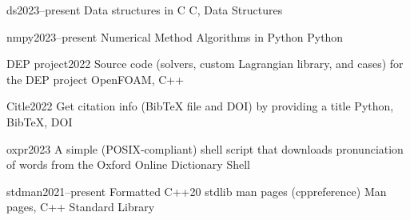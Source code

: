 
\begin{projects}
    \project
    {ds}{2023--present}
    {}
    {Data structures in C}
    {C, Data Structures}

    \project
    {nmpy}{2023--present}
    {}
    {Numerical Method Algorithms in Python}
    {Python}

    \project
    {DEP project}{2022}
    {}
    {Source code (solvers, custom Lagrangian library, and cases) for the DEP project}
    {OpenFOAM, C++}

    \project
    {Citle}{2022}
    {}
    {Get citation info (BibTeX file and DOI) by providing a title}
    {Python, BibTeX, DOI}

    \project
    {oxpr}{2023}
    {}
    {A simple (POSIX-compliant) shell script that downloads pronunciation of words from the Oxford Online Dictionary}
    {Shell}

    \project
    {stdman}{2021--present}
    {}
    {Formatted C++20 stdlib man pages (cppreference)}
    {Man pages, C++ Standard Library}
\end{projects}
